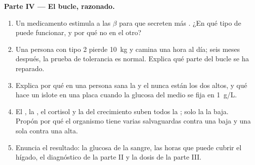 \begin{problem}
\medskip
\noindent\textbf{Parte IV --- El bucle, razonado.}
\begin{enumerate}[resume]
  \item Un medicamento estimula a las  $\beta$ para que secreten
        más . ¿En qué tipo de  puede funcionar, y por
        qué no en el otro?
  \item Una persona con tipo 2 pierde \qty{10}{kg} y camina una hora al
        día; seis meses después, la prueba de tolerancia es normal.
        Explica qué parte del bucle se ha reparado.
  \item Explica por qué en una persona sana la  y el 
        nunca están los dos altos, y qué hace un islote en una placa
        cuando la glucosa del medio se fija en \qty{1}{g/L}.
  \item El , la , el cortisol y la  del
        crecimiento suben todos la ; solo la  la baja.
        Propón por qué el organismo tiene varias salvaguardas contra
        una  baja y una sola contra una alta.
  \item Enuncia el resultado: la glucosa de la sangre, las horas que
        puede cubrir el hígado, el diagnóstico de la parte II y la
        dosis de la parte III.
\end{enumerate}
\end{problem}
